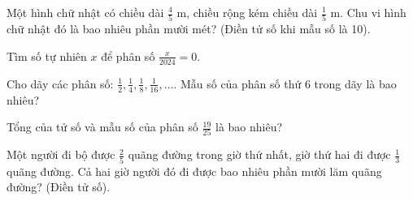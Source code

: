 \begin{ex}
  Một hình chữ nhật có chiều dài $\frac{4}{5}\text{ m}$, chiều rộng kém chiều dài $\frac{1}{5}\text{ m}$. Chu vi hình chữ nhật đó là bao nhiêu phần mười mét? (Điền tử số khi mẫu số là 10).
\end{ex}

\begin{ex}
  Tìm số tự nhiên $x$ để phân số $\frac{x}{2024} = 0$.
\end{ex}

\begin{ex}
  Cho dãy các phân số: $\frac{1}{2}, \frac{1}{4}, \frac{1}{8}, \frac{1}{16}, \dots$. Mẫu số của phân số thứ $6$ trong dãy là bao nhiêu?
\end{ex}

\begin{ex}
  Tổng của tử số và mẫu số của phân số $\frac{19}{25}$ là bao nhiêu?
\end{ex}

\begin{ex}
  Một người đi bộ được $\frac{2}{5}$ quãng đường trong giờ thứ nhất, giờ thứ hai đi được $\frac{1}{3}$ quãng đường. Cả hai giờ người đó đi được bao nhiêu phần mười lăm quãng đường? (Điền tử số).
\end{ex}
